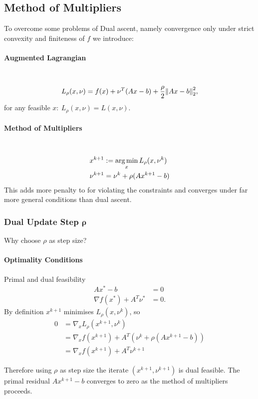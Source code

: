 \subsection{Method of Multipliers}
To overcome some problems of Dual ascent, namely convergence only under strict convexity and finiteness of $f$ we introduce:
\paragraph{Augmented Lagrangian} \
\begin{align*}
    L_\rho (x,\nu) = f(x) + \nu^T (Ax-b)+ {\rho\over 2} \norm{Ax-b}_2^2,
\end{align*}
for any feasible $x:\ L_\rho (x,\nu) = L(x,\nu)$.
\paragraph{Method of Multipliers} \
\begin{align*}
    x^{k+1} &:= \operatorname*{arg\,min}_x L_\rho(x,\nu^k)\\
    \nu^{k+1} &= \nu^k+\rho (Ax^{k+1} -b)
\end{align*}
This adds more penalty to for violating the constraints and converges under far more general conditions than dual ascent.
\subsubsection{Dual Update Step $\mathbf \rho$} Why choose $\rho$ as step size?
\paragraph{Optimality Conditions} Primal and dual feasibility
\begin{align*}
    Ax^* - b &= 0\\
    \nabla f(x^*) +A^T\nu^* &= 0.
\end{align*}
By definition $x^{k+1}$ minimises $L_\rho(x,\nu^k)$, so
\begin{align*}
    0 &= \nabla_x L_\rho (x^{k+1},\nu^k)\\
    &= \nabla_x f(x^{k+1}) +  A^T (\nu^k+\rho(Ax^{k+1} -b))\\
    &= \nabla_x f(x^{k+1}) + A^T \nu^{k+1}
\end{align*}

Therefore using $\rho$ as step size the iterate $(x^{k+1}, \nu^{k+1})$ is dual feasible. The primal residual $Ax^{k+1} -b$ converges to zero as the method of multipliers proceeds.

